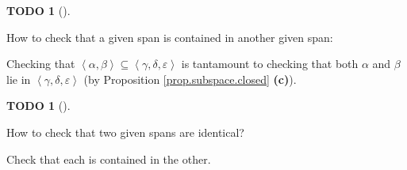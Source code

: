 \documentclass[numbers=enddot,12pt,final,onecolumn,notitlepage]{scrartcl}%
\theoremstyle{definition}
\newtheorem{quest}[theo]{TODO}
\newenvironment{todo}[1][]
{\begin{quest}[#1]\begin{leftbar}}
{\end{leftbar}\end{quest}}
\begin{document}
\begin{todo}
How to check that a given span is contained in another given span:

Checking that $\left\langle \alpha,\beta\right\rangle \subseteq\left\langle
\gamma,\delta,\varepsilon\right\rangle $ is tantamount to checking that both
$\alpha$ and $\beta$ lie in $\left\langle \gamma,\delta,\varepsilon
\right\rangle $ (by Proposition \ref{prop.subspace.closed} \textbf{(c)}).
\end{todo}



\begin{todo}
How to check that two given spans are identical?

Check that each is contained in the other.
\end{todo}
\end{document}
